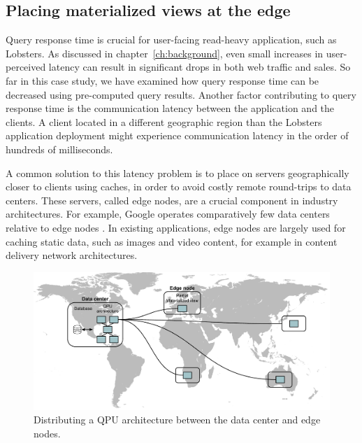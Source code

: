\subsection{Placing materialized views at the edge}


Query response time is crucial for user-facing read-heavy application, such as Lobsters.
As discussed in chapter~\ref{ch:background}, even small increases in user-perceived latency can result in significant drops in both web traffic and sales.
So far in this case study, we have examined how query response time can be decreased using pre-computed query results.
Another factor contributing to query response time is the communication latency between the application and the clients.
A client located in a different geographic region than the Lobsters application deployment might experience communication
latency in the order of hundreds of milliseconds.

A common solution to this latency problem is to place on servers geographically closer to clients using caches,
in order to avoid costly remote round-trips to data centers.
These servers, called edge nodes, are a crucial component in industry architectures.
For example, Google operates comparatively few data centers relative to edge nodes \cite{google:infra}.
In existing applications,
edge nodes are largely used for caching static data, such as images and video content, for example in content delivery network architectures.

\begin{figure}[t]
  \centering
    \includegraphics[scale=0.4]{./figures/case_studies/lobsters_architecture_edge.pdf}
  \caption{Distributing a QPU architecture between the data center and edge nodes.}
  \label{fig:lobsters_architecture_edge}
\end{figure}

